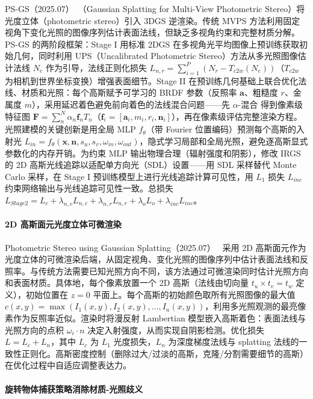 PS-GS（2025.07）~\cite{2507_18231}（Gaussian Splatting for Multi-View Photometric Stereo）将光度立体（photometric stereo）引入 3DGS 逆渲染。传统 MVPS 方法利用固定视角下变化光照的图像序列估计表面法线，但缺乏多视角约束和完整材质分解。PS-GS 的两阶段框架：Stage I 用标准 2DGS 在多视角光平均图像上预训练获取初始几何，同时利用 UPS（Uncalibrated Photometric Stereo）方法从多光照图像估计法线 $N_e$ 作为引导，法线正则化损失 $L_{n,r} = \sum_{i=1}^{P}(N_r - T_{c2w}(N_e))$（$T_{c2w}$ 为相机到世界坐标变换）增强表面细节。Stage II 在预训练几何基础上联合优化法线、材质和光照：每个高斯赋予可学习的 BRDF 参数（反照率 $\boldsymbol{a}$、粗糙度 $r$、金属度 $m$），采用延迟着色避免前向着色的法线混合问题——先 $\alpha$-混合 得到像素级特征图 $\mathbf{F} = \sum_{n}^{N} \alpha_n \mathbf{f}_n T_n$（$\mathbf{f}_i = [\mathbf{a}_i, m_i, r_i, \mathbf{n}_i]$），再在像素级评估完整渲染方程。光照建模的关键创新是用全局 MLP $f_\theta$（带 Fourier 位置编码）预测每个高斯的入射光 $L_{in} = f_\theta(\mathbf{x}, \mathbf{n}, s_u, s_v, \omega_{in}, \omega_{out})$，隐式学习局部和全局光照，避免逐高斯显式参数化的内存开销。为约束 MLP 输出物理合理（辐射强度和阴影），修改 IRGS 的 2D 高斯光线追踪以适配单方向光（SDL）设置——用 SDL 采样替代 Monte Carlo 采样，在 Stage I 预训练模型上进行光线追踪计算可见性，用 $L_1$ 损失 $L_{inc}$ 约束网络输出与光线追踪可见性一致。总损失 $L_{Stage2} = L_c + \lambda_{n,c}L_{n,c} + \lambda_{n,r}L_{n,r} + \lambda_o L_o + \lambda_{inc}L_{inc}$。

\paragraph{2D 高斯面元光度立体可微渲染}

Photometric Stereo using Gaussian Splatting（2025.07）~\cite{2507_06684} 采用 2D 高斯面元作为光度立体的可微渲染后端，从固定视角、变化光照的图像序列中估计表面法线和反照率。与传统方法需要已知光照方向不同，该方法通过可微渲染同时估计光照方向和表面材质。具体地，每个像素放置一个 2D 高斯（法线由切向量 $t_u \times t_v = t_w$ 定义），初始位置在 $z=0$ 平面上。每个高斯的初始颜色取所有光照图像的最大值 $c(x,y) = \max(I_1(x,y), I_2(x,y), \ldots, I_n(x,y))$，利用多光照观测的最亮像素作为反照率近似。渲染时将漫反射 Lambertian 模型嵌入高斯着色：表面法线与光照方向的点积 $\omega_i \cdot n$ 决定入射强度，从而实现自阴影检测。优化损失 $L = L_c + L_n$，其中 $L_c$ 为 $L_1$ 光度损失，$L_n$ 为深度梯度法线与 splatting 法线的一致性正则化。高斯密度控制（删除过大/过淡的高斯，克隆/分割需要细节的高斯）在优化过程中自适应调整表达力。

\paragraph{旋转物体捕获策略消除材质-光照歧义}


